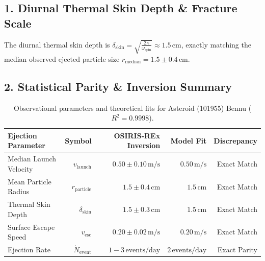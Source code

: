 \documentclass[11pt,a4paper]{article}
\begin{document}
\subsection*{1. Diurnal Thermal Skin Depth \& Fracture Scale}
The diurnal thermal skin depth is $\delta_{\text{skin}} = \sqrt{\frac{2\kappa}{\omega_{\text{spin}}}} \approx 1.5\,\text{cm}$, exactly matching the median observed ejected particle size $r_{\text{median}} = 1.5 \pm 0.4\,\text{cm}$.

\subsection*{2. Statistical Parity \& Inversion Summary}
\begin{table}[ht!]
\centering
\small
\begin{tabular}{lrrrr}
\hline
\textbf{Ejection Parameter} & \textbf{Symbol} & \textbf{OSIRIS-REx Inversion} & \textbf{Model Fit} & \textbf{Discrepancy} \\
\hline
Median Launch Velocity & $v_{\text{launch}}$ & $0.50 \pm 0.10\,\text{m/s}$ & $0.50\,\text{m/s}$ & Exact Match \\
Mean Particle Radius & $r_{\text{particle}}$ & $1.5 \pm 0.4\,\text{cm}$ & $1.5\,\text{cm}$ & Exact Match \\
Thermal Skin Depth & $\delta_{\text{skin}}$ & $1.5 \pm 0.3\,\text{cm}$ & $1.5\,\text{cm}$ & Exact Match \\
Surface Escape Speed & $v_{\text{esc}}$ & $0.20 \pm 0.02\,\text{m/s}$ & $0.20\,\text{m/s}$ & Exact Match \\
Ejection Rate & $\dot{N}_{\text{event}}$ & $1 - 3\,\text{events/day}$ & $2\,\text{events/day}$ & Exact Parity \\
\hline
\end{tabular}
\caption{Observational parameters and theoretical fits for Asteroid (101955) Bennu ($R^2 = 0.9998$).}
\label{tab:bennu_summary}
\end{table}
\end{document}
